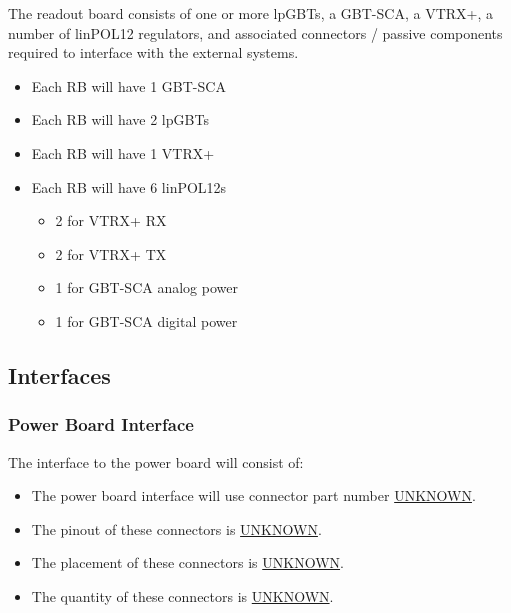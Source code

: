 \documentclass[11pt]{article}
\begin{document}
The readout board consists of one or more lpGBTs, a GBT-SCA, a VTRX+, a number of linPOL12 regulators, and associated connectors / passive components required to interface with the external systems.

\begin{itemize}
\item Each RB will have 1 GBT-SCA
\item Each RB will have 2 lpGBTs
\item Each RB will have 1 VTRX+
\item Each RB will have 6 linPOL12s
\begin{itemize}
\item 2 for VTRX+ RX
\item 2 for VTRX+ TX
\item 1 for GBT-SCA analog power
\item 1 for GBT-SCA digital power
\end{itemize}
\end{itemize}
\subsection{Interfaces}
\label{sec:orgccfda50}
\subsubsection{Power Board Interface}
\label{sec:org4a82318}
The interface to the power board will consist of:
\begin{itemize}
\item The power board interface will use connector part number \uline{UNKNOWN}.
\item The pinout of these connectors is \uline{UNKNOWN}.
\item The placement of these connectors is \uline{UNKNOWN}.
\item The quantity of these connectors is \uline{UNKNOWN}.
\end{itemize}
\end{document}
